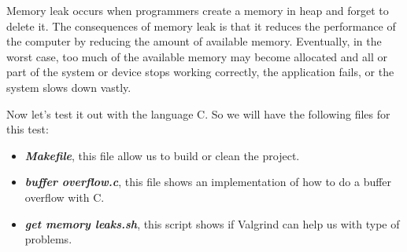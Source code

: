 Memory leak occurs when programmers create a memory in heap and forget to delete it. The
consequences of memory leak is that it reduces the performance of the computer by reducing the
amount of available memory. Eventually, in the worst case, too much of the available memory may
become allocated and all or part of the system or device stops working correctly, the application
fails, or the system slows down vastly.

Now let's test it out with the language C. So we will have the following files for this test:

\begin{itemize}
    \item \textit{\textbf{Makefile}}, this file allow us to build or clean the project.
    \item \textit{\textbf{buffer overflow.c}}, this file shows an implementation of how to do a buffer overflow with C.
    \item \textit{\textbf{get memory leaks.sh}}, this script shows if Valgrind can help us with type
    of problems.
\end{itemize}



\clearpage